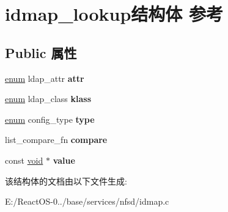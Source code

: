\hypertarget{structidmap__lookup}{}\section{idmap\+\_\+lookup结构体 参考}
\label{structidmap__lookup}
\subsection*{Public 属性}
\begin{DoxyCompactItemize}
\item 
\mbox{\label{structidmap__lookup_ad87292a668b6acd0d11d2b8c419ecda6}} 
\hyperlink{interfaceenum}{enum} ldap\+\_\+attr {\bfseries attr}
\item 
\mbox{\label{structidmap__lookup_aecc370ed68ffacaccf305a86100b4e6c}} 
\hyperlink{interfaceenum}{enum} ldap\+\_\+class {\bfseries klass}
\item 
\mbox{\label{structidmap__lookup_ae08d54e0040d5f8aa73dee46e719a29b}} 
\hyperlink{interfaceenum}{enum} config\+\_\+type {\bfseries type}
\item 
\mbox{\label{structidmap__lookup_a7a803d4cd4f6d361064c3cbc1b85b994}} 
list\+\_\+compare\+\_\+fn {\bfseries compare}
\item 
\mbox{\label{structidmap__lookup_a76e73b975850245f6c3ffb709eab5e7b}} 
const \hyperlink{interfacevoid}{void} $\ast$ {\bfseries value}
\end{DoxyCompactItemize}


该结构体的文档由以下文件生成\+:\begin{DoxyCompactItemize}
\item 
E\+:/\+React\+O\+S-\/0../base/services/nfsd/idmap.\+c\end{DoxyCompactItemize}

